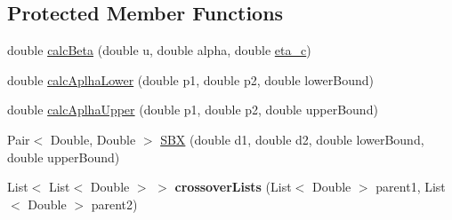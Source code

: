 \subsection*{Protected Member Functions}
\begin{DoxyCompactItemize}
\item 
double \hyperlink{classcom_1_1msu_1_1moo_1_1operators_1_1crossover_1_1SimulatedBinaryCrossover_aae397584c8051c4d1fc84f188a706e37}{calc\-Beta} (double u, double alpha, double \hyperlink{classcom_1_1msu_1_1moo_1_1operators_1_1crossover_1_1SimulatedBinaryCrossover_af0cddf432a1f07e77a59a334caa267d2}{eta\-\_\-c})
\item 
double \hyperlink{classcom_1_1msu_1_1moo_1_1operators_1_1crossover_1_1SimulatedBinaryCrossover_ac584dfe83a0ecfedc90fdb574760b2c7}{calc\-Aplha\-Lower} (double p1, double p2, double lower\-Bound)
\item 
double \hyperlink{classcom_1_1msu_1_1moo_1_1operators_1_1crossover_1_1SimulatedBinaryCrossover_a2630f64686cc61c89549d25735715c68}{calc\-Aplha\-Upper} (double p1, double p2, double upper\-Bound)
\item 
Pair$<$ Double, Double $>$ \hyperlink{classcom_1_1msu_1_1moo_1_1operators_1_1crossover_1_1SimulatedBinaryCrossover_a37fd1bc12cb37b3171e84c9a9b190819}{S\-B\-X} (double d1, double d2, double lower\-Bound, double upper\-Bound)
\item 
\hypertarget{classcom_1_1msu_1_1moo_1_1operators_1_1crossover_1_1SimulatedBinaryCrossover_a958facba6c422920e7e87b46e671de92}{List$<$ List$<$ Double $>$ $>$ {\bfseries crossover\-Lists} (List$<$ Double $>$ parent1, List$<$ Double $>$ parent2)}\label{classcom_1_1msu_1_1moo_1_1operators_1_1crossover_1_1SimulatedBinaryCrossover_a958facba6c422920e7e87b46e671de92}

\end{DoxyCompactItemize}

